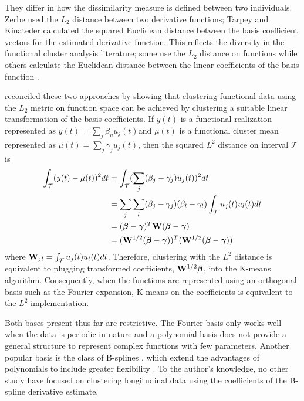 They differ in how the dissimilarity measure is defined between two individuals. Zerbe used the $L_{2}$ distance between two derivative functions; Tarpey and Kinateder calculated the squared Euclidean distance between the basis coefficient vectors for the estimated derivative function. This reflects the diversity in the functional cluster analysis literature; some use the $L_{2}$ distance on functions \cite{hitchcock2007} while others calculate the Euclidean distance between the linear coefficients of the basis function \cite{serban2005, tarpey2003, abraham2003}.
 
\textcite{tarpey2007} reconciled these two approaches by showing that clustering functional data using the $L_{2}$ metric on function space can be achieved by clustering a suitable linear transformation of the basis coefficients. If $y(t)$ is a functional realization represented as $y(t)=\sum_{j}\beta_{u}u_{j}(t)$and $\mu(t)$ is a functional cluster mean represented as $\mu(t) = \sum_{j}\gamma_{j}u_{j}(t)$, then the squared $L^{2}$ distance on interval $\mathcal{T}$ is
\begin{align*}
\int_{\mathcal{T}}(y(t)-\mu(t))^{2}dt &= \int_{\mathcal{T}}(\sum_{j}(\beta_{j}-\gamma_{j})u_{j}(t))^{2}dt\\
&= \sum_{j}\sum_{l}(\beta_{j}-\gamma_{j})(\beta_{l}-\gamma_{l}) \int_{\mathcal{T}}u_{j}(t)u_{l}(t)dt\\
&=(\boldsymbol\beta-\boldsymbol\gamma)^{T}\mathbf W (\boldsymbol\beta-\boldsymbol\gamma)\\
&=(\mathbf W^{1/2}(\boldsymbol\beta-\boldsymbol\gamma))^{T} (\mathbf W^{1/2}(\boldsymbol\beta-\boldsymbol\gamma))
\end{align*}
where $\mathbf W_{jl} = \int_{\mathcal{T}}u_{j}(t)u_{l}(t)dt$. Therefore, clustering with the $L^{2}$ distance is equivalent to plugging transformed coefficients, $\mathbf W^{1/2}\boldsymbol\beta$, into the K-means algorithm. Consequently, when the functions are represented using an orthogonal basis such as the Fourier expansion, K-means on the coefficients is equivalent to the $L^{2}$ implementation.

Both bases present thus far are restrictive. The Fourier basis only works well when the data is periodic in nature and a polynomial basis does not provide a general structure to represent complex functions with few parameters. Another popular basis is the class of B-splines \cite{deboor1978, schumaker1981}, which extend the advantages of polynomials to include greater flexibility \cite{abraham2003}. To the author's knowledge, no other study have focused on clustering longitudinal data using the coefficients of the B-spline derivative estimate.

